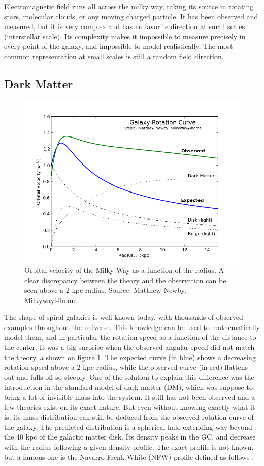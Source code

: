 Electromagnetic field runs all across the milky way, taking its source in rotating stars, molecular clouds, or any moving charged particle. It has been observed and measured, but it is very complex and has no favorite direction at small scales (interstellar scale). Its complexity makes it impossible to measure precisely in every point of the galaxy, and impossible to model realistically. The most common representation at small scales is still a random field direction.

\subsection{Dark Matter}

\begin{figure}[h]
 \centering
 \includegraphics[width=.5\linewidth]{pic/theory/gal_rotation_curve.png}
 \caption{Orbital velocity of the Milky Way as a function of the radius. A clear discrepancy between the theory and the observation can be seen above a 2 kpc radius. Source: Matthew Newby, Milkyway@home}
 \label{fig:gal_rotation_curve}
\end{figure}


The shape of spiral galaxies is well known today, with thousands of observed examples throughout the universe. This knowledge can be used to mathematically model them, and in particular the rotation speed as a function of the distance to the center. It was a big surprise when the observed angular speed did not match the theory, a shown on figure \ref{fig:gal_rotation_curve}. The expected curve (in blue) shows a decreasing rotation speed above a 2 kpc radius, while the observed curve (in red) flattens out and falls off so steeply.
One of the solution to explain this difference was the introduction in the standard model of dark matter (DM), which was suppose to bring a lot of invisible mass into the system. It still has not been observed and a few theories exist on its exact nature. But even without knowing exactly what it is, its mass distribution can still be deduced from the observed rotation curve of the galaxy. The predicted distribution is a spherical halo extending way beyond the 40 kpc of the galactic matter disk. Its density peaks in the GC, and decrease with the radius following a given density profile. The exact profile is not known, but a famous one is the Navarro-Frenk-White (NFW) profile defined as follows :

